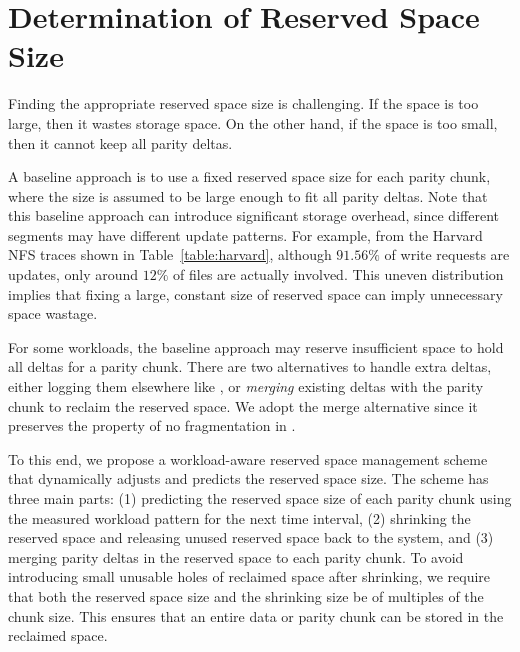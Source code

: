 \section{Determination of Reserved Space Size}
\label{sec:reserve_strategies}

Finding the appropriate reserved space size is challenging.  If the space is
too large, then it wastes storage space.   On the other hand, if the space is
too small, then it cannot keep all parity deltas.  




A baseline approach is to use a fixed reserved space size for each parity
chunk, where the size is assumed to be large enough to fit all parity deltas.  
Note that this baseline approach can introduce
significant storage overhead, since different segments may have different
update patterns.  For example, from the Harvard NFS traces shown in
Table~\ref{table:harvard}, although $91.56\%$ of write requests are updates,
only around $12\%$ of files are actually involved.  This uneven distribution
implies that fixing a large, constant size of reserved space can imply
unnecessary space wastage. 

For some workloads, the baseline approach may reserve insufficient space to
hold all deltas for a parity chunk. There are two alternatives to handle extra
deltas, either logging them elsewhere like \PL, or \textit{merging} existing
deltas with the parity chunk to reclaim the reserved space.  We adopt the
merge alternative since it preserves the property of no fragmentation in
\PLR.

To this end, we propose a workload-aware reserved space management scheme that
dynamically adjusts and predicts the reserved space size. The scheme has
three main parts: 
(1) predicting the reserved space size of each parity chunk 
using the measured workload pattern for the next time interval, 
(2) shrinking the reserved space and releasing unused reserved space back to 
the system, and
(3) merging parity deltas in the reserved space to each parity chunk.
To avoid introducing small unusable holes of reclaimed space after shrinking,
we require that both the reserved space size and the shrinking size be of
multiples of the chunk size.  This ensures that an entire data or parity chunk
can be stored in the reclaimed space. 

